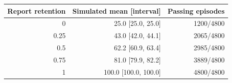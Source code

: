 \begin{tabular}{rrr}\toprule Report retention & Simulated mean [interval] & Passing episodes \\ \midrule 0 & 25.0 [25.0, 25.0] & 1200/4800 \\ 0.25 & 43.0 [42.0, 44.1] & 2065/4800 \\ 0.5 & 62.2 [60.9, 63.4] & 2985/4800 \\ 0.75 & 81.0 [79.9, 82.2] & 3889/4800 \\ 1 & 100.0 [100.0, 100.0] & 4800/4800 \\ \bottomrule\end{tabular}
